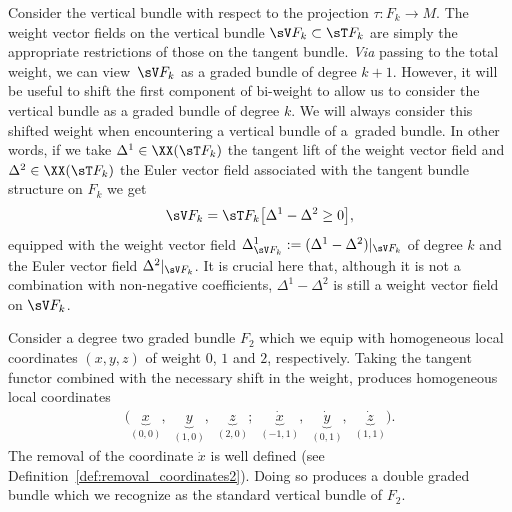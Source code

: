 \begin{Example} Consider the vertical bundle with respect to the projection $\tau\colon F_{k} \rightarrow M$. The weight vector f\/ields on the vertical bundle $\sV F_{k} \subset \sT F_{k}$ are simply the appropriate restrictions of those on the tangent bundle. \emph{Via} passing to the total weight, we can view~$\sV F_{k}$ as a graded bundle of degree $k+1$. However, it will be useful to shift the f\/irst component of bi-weight to allow us to consider the vertical bundle as a graded bundle of degree $k$. We will always consider this shifted weight when encountering a vertical bundle of a~graded bundle. In other words, if we take $\Delta^1\in \XX(\sT F_k)$ the tangent lift of the weight vector f\/ield and $\Delta^2\in \XX(\sT F_k)$ the Euler vector f\/ield associated with the tangent bundle structure on $F_k$ we get
\begin{gather*}
\sV F_k = \sT F_k\big[\Delta^1-\Delta^2 \geq 0\big],
\end{gather*}
equipped with the weight vector f\/ield $\Delta^1_{\sV F_k}:= (\Delta^1-\Delta^2)|_{\sV F_k}$ of degree $k$ and the Euler vector f\/ield $\Delta^2|_{\sV F_k}$. It is crucial here that, although it is not a combination with non-negative coef\/f\/icients, $\Delta^1-\Delta^2$ is still a weight vector f\/ield on $\sV F_k$.
\end{Example}

\begin{Example}
 Consider a degree two graded bundle $F_{2}$ which we equip with homogeneous local coordinates $(x,y,z)$ of weight $0$, $1$ and $2$, respectively. Taking the tangent functor combined with the necessary shift in the weight, produces homogeneous local coordinates
 \begin{gather*}
 \Big(\underbrace{x}_{(0,0)}, \hspace{5pt} \underbrace{y}_{(1,0)}, \hspace{5pt} \underbrace{z}_{(2,0)}; \hspace{5pt} \underbrace{\dot{x}}_{(-1,1)},\hspace{5pt}\underbrace{\dot{y}}_{(0,1)}, \hspace{5pt} \underbrace{\dot{z}}_{(1,1)}\Big).
 \end{gather*}
The removal of the coordinate $\dot{x}$ is well def\/ined (see Def\/inition~\ref{def:removal_coordinates2}). Doing so produces a double graded bundle which we recognize as the standard vertical bundle of $F_{2}$.
 \end{Example}

